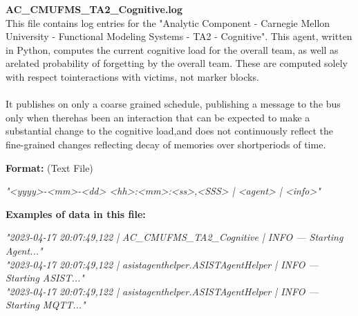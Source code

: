 \begin{description}
\begin{addmargin}[0em]{0em}
    \label{AC_CMUFMS_TA2_Cognitive.log}
    \begin{addmargin}[1em]{0em} %
        \textbf{AC\_CMUFMS\_TA2\_Cognitive.log}\\
        This file contains log entries for the "Analytic Component - Carnegie Mellon University - Functional Modeling Systems - TA2 - Cognitive".
        This agent, written in Python, computes the current cognitive load for the overall team, as well as arelated probability of forgetting by the overall team.
        These are computed solely with respect tointeractions with victims, not marker blocks.\\\\
        It publishes on only a coarse grained schedule, publishing a message to the bus only when therehas been an interaction that can be expected to make
        a substantial change to the cognitive load,and does not continuously reflect the fine-grained changes reflecting decay of memories over shortperiods of time.
        \begin{addmargin}[1em]{0em}
            \textbf{Format:} (Text File)
            \begin{addmargin}[1em]{0em}
                \textit{"<yyyy>-<mm>-<dd> <hh>:<mm>:<ss>,<SSS> | <agent> | <info>"}
            \end{addmargin}
        \end{addmargin}
        \begin{addmargin}[1em]{0em}
            \textbf{Examples of data in this file:}
                \begin{addmargin}[1em]{0em}\textit{"2023-04-17 20:07:49,122 | AC\_CMUFMS\_TA2\_Cognitive | INFO — Starting Agent..."\\
                    "2023-04-17 20:07:49,122 | asistagenthelper.ASISTAgentHelper | INFO — Starting ASIST..."\\
                    "2023-04-17 20:07:49,122 | asistagenthelper.ASISTAgentHelper | INFO — Starting MQTT..."}
                \end{addmargin}
        \end{addmargin}
    \end{addmargin} %
    \textbf{\\}


\end{addmargin}
\end{description}
